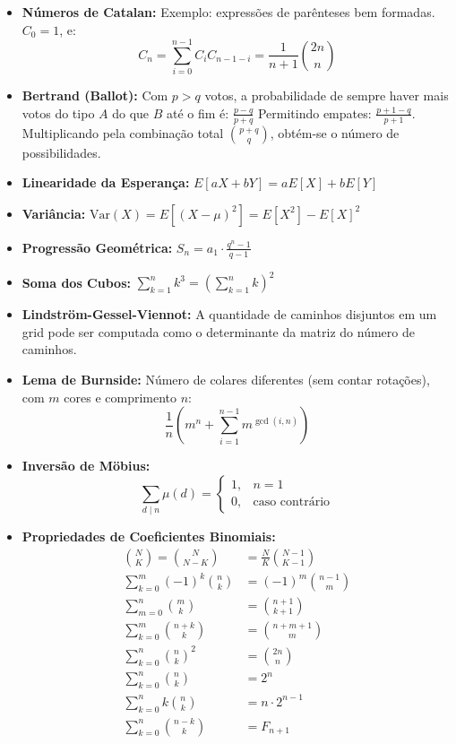\begin{small}
\begin{itemize}
    \item \textbf{Números de Catalan:} Exemplo: expressões de parênteses bem formadas. $C_0 = 1$, e:
    \[
    C_n = \sum_{i=0}^{n-1} C_i C_{n-1-i} = \frac{1}{n+1} \binom{2n}{n}
    \]


    \item \textbf{Bertrand (Ballot):} Com $p > q$ votos, a probabilidade de sempre haver mais votos do tipo $A$ do que $B$ até o fim é:
    $ \frac{p - q}{p + q} $
    Permitindo empates: 
    $\frac{p + 1 - q}{p + 1}$. Multiplicando pela combinação total $\binom{p + q}{q}$, obtém-se o número de possibilidades.

    
    \item \textbf{Linearidade da Esperança:} $E[aX + bY] = aE[X] + bE[Y]$

    \item \textbf{Variância:} $\text{Var}(X) = E[(X - \mu)^2] = E[X^2] - E[X]^2$

    \item \textbf{Progressão Geométrica:} $S_n = a_1 \cdot \frac{q^n - 1}{q - 1}$

    \item \textbf{Soma dos Cubos:} $\sum_{k=1}^{n} k^3 = \left( \sum_{k=1}^{n} k \right)^2$

    \item \textbf{Lindström-Gessel-Viennot:} A quantidade de caminhos disjuntos em um grid pode ser computada como o determinante da matriz do número de caminhos.
    
    \item \textbf{Lema de Burnside:} Número de colares diferentes (sem contar rotações), com $m$ cores e comprimento $n$:
    \[
    \frac{1}{n} \left(m^n + \sum_{i=1}^{n-1} m^{\gcd(i, n)} \right)
    \]

    \item \textbf{Inversão de Möbius:}
    \[
    \sum_{d \mid n} \mu(d) = \begin{cases}
    1, & n = 1 \\
    0, & \text{caso contrário}
    \end{cases}
    \]

    \item \textbf{Propriedades de Coeficientes Binomiais:}
    \begin{align*}
        \binom{N}{K} = \binom{N}{N - K} &= \frac{N}{K} \binom{N - 1}{K - 1} \\
        \sum_{k=0}^{m} (-1)^k \binom{n}{k} &= (-1)^m \binom{n - 1}{m} \\
        \sum_{m=0}^{n} \binom{m}{k} &= \binom{n+1}{k+1} \\
        \sum_{k=0}^{m} \binom{n + k}{k} &= \binom{n + m + 1}{m} \\
        \sum_{k=0}^{n} \binom{n}{k}^2 &= \binom{2n}{n} \\
        \sum_{k=0}^{n} \binom{n}{k} &= 2^n \\
        \sum_{k=0}^{n} k \binom{n}{k} &= n \cdot 2^{n - 1} \\
        \sum_{k=0}^{n} \binom{n-k}{k} &= F_{n+1}
    \end{align*}


\end{itemize}
\end{small}

